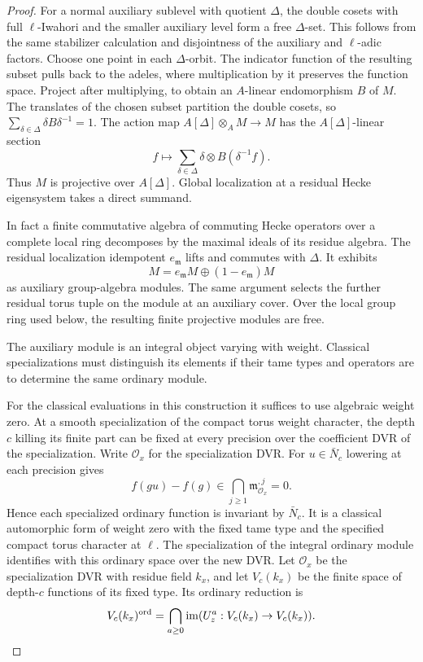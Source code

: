 \begin{proof}
For a normal auxiliary sublevel with quotient
\(\Delta\), the double cosets with full
\(\ell\)-Iwahori and the smaller auxiliary level
form a free \(\Delta\)-set. This follows from the
same stabilizer calculation and disjointness of
the auxiliary and \(\ell\)-adic factors. Choose one
point in each \(\Delta\)-orbit. The indicator function
of the resulting subset pulls back to the adeles,
where multiplication by it preserves the function
space. Project after multiplying, to obtain an
\(A\)-linear endomorphism \(B\) of \(M\). The translates
of the chosen subset partition the double cosets, so
\(\sum_{\delta\in\Delta}\delta B\delta^{-1}=1\).
The action map \(A[\Delta]\otimes_A M\to M\) has the
\(A[\Delta]\)-linear section
\[
 f\longmapsto\sum_{\delta\in\Delta}
                \delta\otimes B(\delta^{-1}f).
\]
Thus \(M\) is projective over \(A[\Delta]\).
Global localization at a residual Hecke eigensystem
takes a direct summand.

In fact a finite commutative
algebra of commuting Hecke operators over a complete
local ring decomposes by the maximal ideals of its
residue algebra. The residual localization idempotent \(e_\mathfrak m\)
lifts and commutes with \(\Delta\). It exhibits
\[
       M=e_\mathfrak m M\oplus(1-e_\mathfrak m)M
\]
as auxiliary group-algebra modules. The same
argument selects the further residual torus tuple
on the module at an auxiliary cover. Over the
local group ring used below, the resulting finite
projective modules are free.


The auxiliary module is an integral object varying with weight. Classical specializations must distinguish its elements if their tame types and operators are to determine the same ordinary module.


For the classical evaluations in this construction
it suffices to use algebraic weight zero. At a smooth
specialization of the compact torus weight character,
the depth \(c\) killing its finite part can be fixed
at every precision over the coefficient DVR
of the specialization. Write \(\mathcal O_x\) for the specialization DVR. For \(u\in\bar N_c\) lowering at each precision gives
\[
 f(gu)-f(g)\in\bigcap_{j\ge1}\mathfrak m_{\mathcal O_x}^{,j}=0 .
\]
Hence each specialized ordinary function is invariant by \(\bar N_c\). It is a classical automorphic
form of weight zero with the fixed tame type and
the specified compact torus character at \(\ell\).
The specialization of the integral ordinary module
identifies with this ordinary space over the new
DVR. Let \(\mathcal O_x\) be the specialization DVR with
residue field \(k_x\), and let \(V_c(k_x)\) be the finite space
of depth-\(c\) functions of its fixed type. Its ordinary
reduction is
\[
 V_c(k_x)^{\rm ord}=\bigcap_{a\ge0}\operatorname{im}
                       (U_z^a:V_c(k_x)\to V_c(k_x)).
\]


\end{proof}
